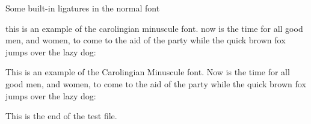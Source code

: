 \documentclass{article}
\newcommand{\sentence}{%
this is an example of the carolingian minuscule font. now is the time for all good
men, and women, to come to the aid of the party while the quick brown fox
jumps over the lazy dog:}
\newcommand{\Sentence}{%
This is an example of the Carolingian Minuscule font. Now is the time for all good
men, and women, to come to the aid of the party while the quick brown fox
jumps over the lazy dog:}
\newcommand{\esses}{sa sb sc sd se sf sg sh si sj sk sl sm 
                    sn so sp sq sr ss st su sv sw sx sy sz}
\newcommand{\exes}{xa xb xc xd xe xf xg xh xi xj xk xl xm 
                  xn xo xp xq xr xs xt xu xv xw xx xy xz}
\newcommand{\jays}{aj bj cj dj ej fj gj hj ij jj kj lj mj 
                   nj oj pj qj rj sj tj uj vj wj xj yj zj}
\newcommand{\dees}{ad bd cd dd ed fd gd hd id jd kd ld md 
                   nd od pd qd rd sd td ud vd wd xd yd zd}
\newcommand{\ares}{ra rb rc rd re rf rg rh ri rj rk rl rm 
                   rn ro rp rq rr rs rt ru rv rw rx ry rz}
\newcommand{\Esses}{SA SB SC SD SE SF SG SH SI SJ SK SL SM 
                    SN SO SP SQ SR SS ST SU SV SW SX SY SZ}
\newcommand{\Exes}{XA XB XC XD XE XF XG XH XI XJ XK XL XM 
                  XN XO XP XQ XR XS XT XU XV XW XX XY XZ}
\newcommand{\Jays}{AJ BJ CJ DJ EJ FJ GJ HJ IJ JJ KJ LJ MJ 
                   NJ OJ PJ QJ RJ SJ TJ UJ VJ WJ XJ YJ ZJ}
\newcommand{\Dees}{AD BD CD DD ED FD GD HD ID JD KD LD MD 
                   ND OD PD QD RD SD TD UD VD WD XD YD ZD}
\newcommand{\Ares}{RA RB RC RD RE RF RG RH RI RJ RK RL RM 
                   RN RO RP RQ RR RS RT RU RV RW RX RY RZ}
\begin{document}
\begin{center}
    Some built-in ligatures in the normal font \\
\end{center}


{
\cminfamily 
\sentence{}

\Sentence{}
}
    
    This is the end of the test file.
\end{document}
